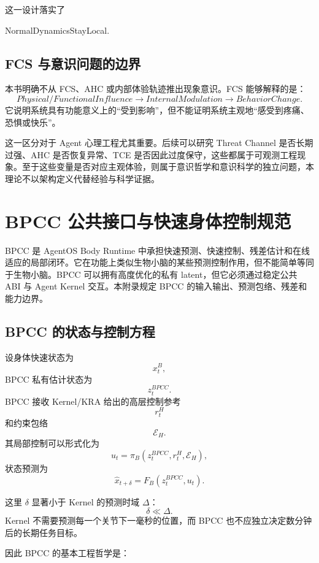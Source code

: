 这一设计落实了
\begin{statementbox}
NormalDynamicsStayLocal.
\end{statementbox}

\section{FCS 与意识问题的边界}

本书明确不从 FCS、AHC 或内部体验轨迹推出现象意识。FCS 能够解释的是：
\[
Physical/FunctionalInfluence
\rightarrow
InternalModulation
\rightarrow
BehaviorChange.
\]
它说明系统具有功能意义上的“受到影响”，但不能证明系统主观地“感受到疼痛、恐惧或快乐”。

这一区分对于 Agent 心理工程尤其重要。后续可以研究 Threat Channel 是否长期过强、AHC 是否恢复异常、TCE 是否因此过度保守，这些都属于可观测工程现象。至于这些变量是否对应主观体验，则属于意识哲学和意识科学的独立问题，本理论不以架构定义代替经验与科学证据。


\chapter{BPCC 公共接口与快速身体控制规范}
\label{app:bpcc}

\begin{chapterlead}
BPCC 是 AgentOS Body Runtime 中承担快速预测、快速控制、残差估计和在线适应的局部闭环。它在功能上类似生物小脑的某些预测控制作用，但不能简单等同于生物小脑。BPCC 可以拥有高度优化的私有 latent，但它必须通过稳定公共 ABI 与 Agent Kernel 交互。本附录规定 BPCC 的输入输出、预测包络、残差和能力边界。
\end{chapterlead}

\section{BPCC 的状态与控制方程}

设身体快速状态为
\[
x^B_t,
\]
BPCC 私有估计状态为
\[
z^{BPCC}_t.
\]
BPCC 接收 Kernel/KRA 给出的高层控制参考
\[
r_t^H
\]
和约束包络
\[
\mathcal E_H.
\]
其局部控制可以形式化为
\[
u_t
=
\pi_B(
z_t^{BPCC},
r_t^H,
\mathcal E_H
),
\]
状态预测为
\[
\hat x_{t+\delta}
=
F_B(
z_t^{BPCC},
u_t
).
\]

这里 $\delta$ 显著小于 Kernel 的预测时域 $\Delta$：
\[
\delta\ll\Delta.
\]
Kernel 不需要预测每一个关节下一毫秒的位置，而 BPCC 也不应独立决定数分钟后的长期任务目标。

因此 BPCC 的基本工程哲学是：
\begin{statementbox}
\centering
{}
\end{statementbox}


